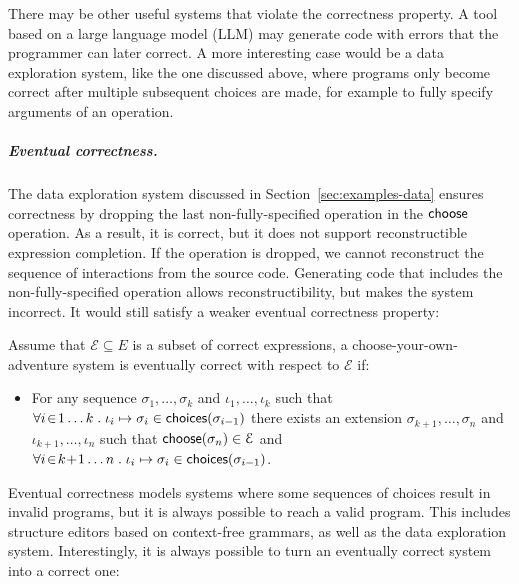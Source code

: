 \documentclass[ a4paper,UKenglish,cleveref, autoref, thm-restate]{lipics-v2021}
\newcommand{\ident}[1]{\textsf{#1}}
\newcommand{\select}{\textnormal{\ident{choose}}}
\newcommand{\choices}{\textnormal{\ident{choices}}}
\begin{document}
There may be other useful systems that violate the correctness property. A tool based on a large
language model (LLM) may generate code with errors that the programmer can later
correct. A more interesting case would be a data exploration system, like the one discussed above,
where programs only become correct after multiple subsequent choices are made, for example
to fully specify arguments of an operation.

\subparagraph{Eventual correctness.}
The data exploration system discussed in Section~\ref{sec:examples-data} ensures correctness
by dropping the last non-fully-specified operation in the $\select$ operation. As a result, it is
correct, but it does not support reconstructible expression completion. If the operation is dropped,
we cannot reconstruct the sequence of interactions from the source code. Generating code
that includes the non-fully-specified operation allows reconstructibility, but makes the system
incorrect. It would still satisfy a weaker eventual correctness property:

\begin{definition}\label{def:eventual}
Assume that $\mathcal{E}\subseteq E$ is a subset of correct expressions,
a choose-your-own-adventure system is eventually correct with respect to $\mathcal{E}$ if:
\begin{itemize}
\item For any sequence $\sigma_1,\ldots,\sigma_k$ and $\iota_1,\ldots,\iota_k$ such that
  $\forall i\!\in\! 1\ldots k\;.\; \iota_i\mapsto\sigma_i \in \choices(\sigma_{i-1})$
  there exists an extension $\sigma_{k+1},\ldots,\sigma_n$ and $\iota_{k+1},\ldots,\iota_n$ such that
  $\select(\sigma_n) \in \mathcal{E}$ and
  $\forall i\!\in\! k\!+\!1\ldots n\;.\;\iota_i\mapsto\sigma_i \in \choices(\sigma_{i-1})$.
\end{itemize}
\end{definition}

Eventual correctness models systems where some sequences of choices result in invalid programs,
but it is always possible to reach a valid program. This includes
structure editors based on context-free grammars, as well as the data exploration system.
Interestingly, it is always possible to turn an eventually correct system into a correct one:
\end{document}

